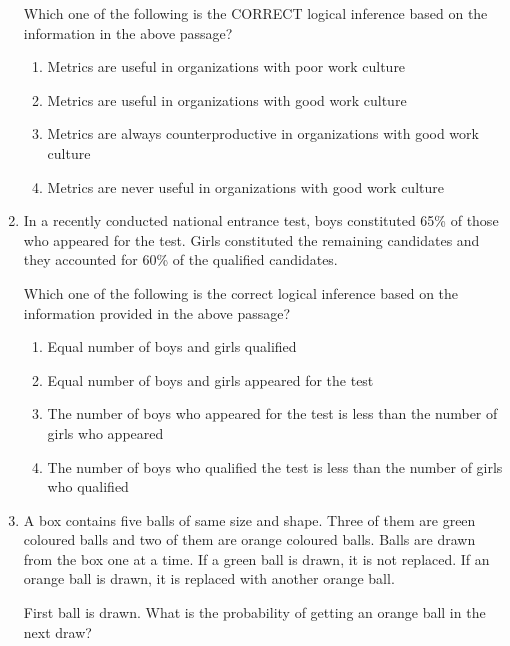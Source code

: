 \begin{enumerate}
Which one of the following is the CORRECT logical inference based on the information in the above passage?  

\begin{enumerate}
\item Metrics are useful in organizations with poor work culture
\item Metrics are useful in organizations with good work culture
\item Metrics are always counterproductive in organizations with good work culture
\item Metrics are never useful in organizations with good work culture
\end{enumerate}

\hfill{}

\item In a recently conducted national entrance test, boys constituted 65\% of those who appeared for the test. Girls constituted the remaining candidates and they accounted for 60\% of the qualified candidates.  

Which one of the following is the correct logical inference based on the information provided in the above passage?  

\begin{enumerate}
\item Equal number of boys and girls qualified
\item Equal number of boys and girls appeared for the test
\item The number of boys who appeared for the test is less than the number of girls who appeared
\item The number of boys who qualified the test is less than the number of girls who qualified
\end{enumerate}

\hfill{}

\item A box contains five balls of same size and shape. Three of them are green coloured balls and two of them are orange coloured balls. Balls are drawn from the box one at a time. If a green ball is drawn, it is not replaced. If an orange ball is drawn, it is replaced with another orange ball.  

First ball is drawn. What is the probability of getting an orange ball in the next draw?  

\begin{enumerate}
\end{enumerate}


\end{enumerate}
